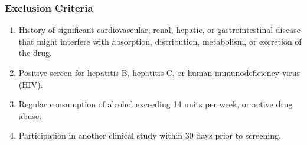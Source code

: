 \subsubsection{Exclusion Criteria}
\begin{enumerate}[label=\lbrack\arabic*\rbrack]
  \item History of significant cardiovascular, renal, hepatic, or gastrointestinal disease that might interfere with absorption, distribution, metabolism, or excretion of the drug.
  \item Positive screen for hepatitis B, hepatitis C, or human immunodeficiency virus (HIV).
  \item Regular consumption of alcohol exceeding 14 units per week, or active drug abuse.
  \item Participation in another clinical study within 30 days prior to screening.
\end{enumerate}
